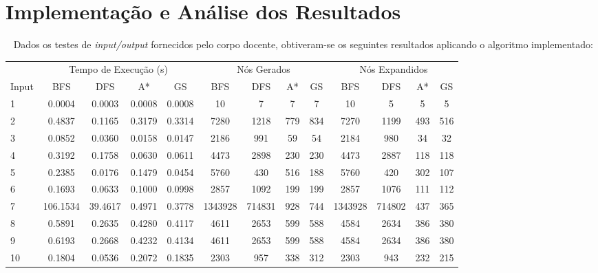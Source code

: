 \documentclass[12pt]{exam}
\renewcommand\_{\textunderscore\linebreak[1]}
\begin{document}
    \section{Implementação e Análise dos Resultados}~
        \indent Dados os testes de \textit{input/output} fornecidos pelo corpo docente, obtiveram-se os seguintes resultados aplicando o algoritmo implementado:\\

        \begin{adjustbox}{width={\textwidth}, totalheight={\textheight}, keepaspectratio}
        \begin{tabular}{l cccc cccc cccc}
        \toprule
         & \multicolumn{4}{c}{Tempo de Execução (s)} & \multicolumn{4}{c}{Nós Gerados} & \multicolumn{4}{c}{Nós Expandidos}\\
        \cmidrule(lr){2-5} \cmidrule(lr){6-9} \cmidrule(lr){10-13}
        Input           & BFS  & DFS  & A* & GS       & BFS  & DFS  & A* & GS        & BFS  & DFS  & A* & GS \\
        \midrule
        1               & 0.0004 & 0.0003  & 0.0008    & 0.0008            & 10    & 7 & 7    & 7       & 10   & 5   & 5      &5  \\
        2               & 0.4837 & 0.1165  & 0.3179    & 0.3314            & 7280  & 1218 & 779  & 834       & 7270   & 1199   & 493    &516  \\
        3               & 0.0852 & 0.0360  & 0.0158    & 0.0147            & 2186  & 991 & 59   & 54       & 2184   & 980   & 34     &32  \\
        4               & 0.3192 & 0.1758  & 0.0630    & 0.0611            & 4473  & 2898 & 230  & 230       & 4473   & 2887   & 118    &118  \\
        5               & 0.2385 & 0.0176  & 0.1479    & 0.0454            & 5760  & 430 & 516  & 188       & 5760   & 420   & 302    &107  \\
        6               & 0.1693 & 0.0633  & 0.1000    & 0.0998            & 2857  & 1092 & 199  & 199       & 2857   & 1076   & 111    &112  \\
        7             & 106.1534 & 39.4617  & 0.4971    & 0.3778         & 1343928  & 714831 & 928  & 744       & 1343928   & 714802   & 437    &365  \\
        8               & 0.5891 & 0.2635  & 0.4280    & 0.4117            & 4611  & 2653 & 599  & 588       & 4584   & 2634   & 386    &380  \\
        9               & 0.6193 & 0.2668  & 0.4232    & 0.4134            & 4611  & 2653 & 599  & 588       & 4584   & 2634   & 386    &380  \\
        10              & 0.1804 & 0.0536  & 0.2072    & 0.1835            & 2303  & 957 & 338  & 312       & 2303   & 943   & 232    &215  \\
        \bottomrule
        \end{tabular}
        \end{adjustbox} \\
\end{document}
